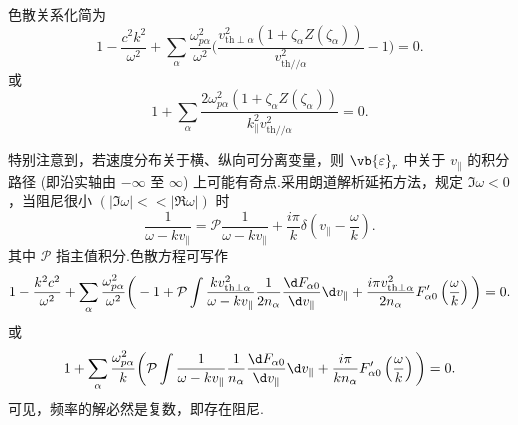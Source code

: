 \begin{example}
	色散关系化简为
	\begin{equation*}
		1 - \frac{c^2k^2}{\omega^2} + \sum_\alpha\frac{\omega_{p\alpha}^2}{\omega^2}\bigg(\frac{v_{\mathrm{th}\perp\alpha}^2\left(1+\zeta_\alpha Z(\zeta_\alpha)\right)}{v_{\mathrm{th}//\alpha}^2}-1\bigg) = 0.
	\end{equation*}
	或
	\begin{equation*}
		1 + \sum_\alpha\frac{2\omega_{p\alpha}^2\left(1+\zeta_\alpha Z(\zeta_\alpha)\right)}{k_{\parallel}^2v_{\mathrm{th}//\alpha}^2} = 0.
	\end{equation*}

	特别注意到，若速度分布关于横、纵向可分离变量，则 \(\vb{\varepsilon}_r\) 中关于 \(v_{\parallel}\) 的积分路径 (即沿实轴由 \(-\infty\) 至 \(\infty\)) 上可能有奇点.采用朗道解析延拓方法，规定 \(\Im\omega<0\)，当阻尼很小 \(\left(|\Im \omega|<<|\Re\omega|\right)\) 时
	\begin{equation*}
		\frac{1}{\omega-k v_{\parallel}} = \mathcal{P}\frac{1}{\omega-k v_{\parallel}} + \frac{i\pi}{k}\delta\left(v_{\parallel}-\frac{\omega}{k}\right).
	\end{equation*}
	其中 \(\mathcal{P}\) 指主值积分.色散方程可写作
	\begin{equation*}
		1 - \frac{k^2c^2}{\omega^2} + \sum_\alpha\frac{\omega_{p\alpha}^2}{\omega^2}\bigg(-1 + \mathcal{P}\int\frac{k v_{\mathrm{th}\perp\alpha}^2}{\omega-k v_{\parallel}}\frac{1}{2n_\alpha}\frac{\d F_{\alpha0}}{\d v_{\parallel}}\d v_{\parallel} + \frac{i\pi v_{\mathrm{th}\perp\alpha}^2}{2n_\alpha}F_{\alpha0}^\prime\left(\frac{\omega}{k}\right)\bigg) = 0.
	\end{equation*}
	或
	\begin{equation*}
		1 + \sum_\alpha\frac{\omega_{p\alpha}^2}{k}\bigg(\mathcal{P}\int\frac{1}{\omega-k v_{\parallel}}\frac{1}{n_\alpha}\frac{\d F_{\alpha0}}{\d v_{\parallel}}\d v_{\parallel} + \frac{i\pi}{k n_\alpha}F_{\alpha0}^\prime\left(\frac{\omega}{k}\right)\bigg) = 0.
	\end{equation*}
	可见，频率的解必然是复数，即存在阻尼.
\end{example}

